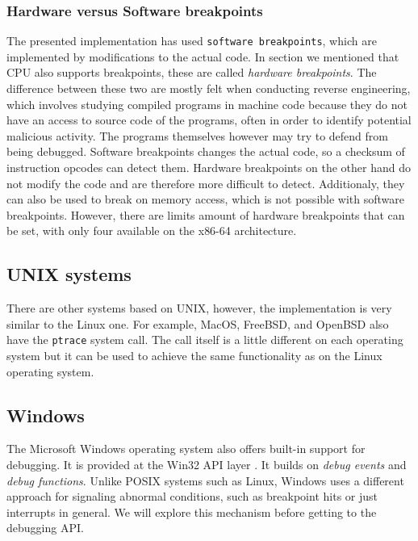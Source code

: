 \subsubsection*{Hardware versus Software breakpoints}
The presented implementation has used \texttt{software breakpoints}, which are
implemented by modifications to the actual code. In section
 we mentioned that CPU also supports
breakpoints, these are called \textit{hardware breakpoints}. The difference
between these two are mostly felt when conducting reverse engineering, which
involves studying compiled programs in machine code because they do not have an
access to source code of the programs, often in order to identify potential
malicious activity. The programs themselves however may try to defend from
being debugged. Software breakpoints changes the actual code, so a checksum of
instruction opcodes can detect them. Hardware breakpoints on the other hand do
not modify the code and are therefore more difficult to detect. Additionaly,
they can also be used to break on memory access, which is not possible with
software breakpoints. However, there are limits amount of hardware breakpoints
that can be set, with only four available on the x86-64 architecture.

\subsection{UNIX systems}
There are other systems based on UNIX, however, the implementation is very
similar to the Linux one. For example, MacOS, FreeBSD, and OpenBSD also have
the \texttt{ptrace} system call. The call itself is a little different on each
operating system but it can be used to achieve the same functionality as on the
Linux operating system.

\subsection{Windows}
The Microsoft Windows operating system also offers built-in support for
debugging. It is provided at the Win32 API layer
\cite{windows-msdn-debugging-api, windows-press-debugging-api}. It builds on
\textit{debug events} and \textit{debug functions}. Unlike POSIX systems such
as Linux, Windows uses a different approach for signaling abnormal conditions,
such as breakpoint hits or just interrupts in general. We will explore this
mechanism before getting to the debugging API.

